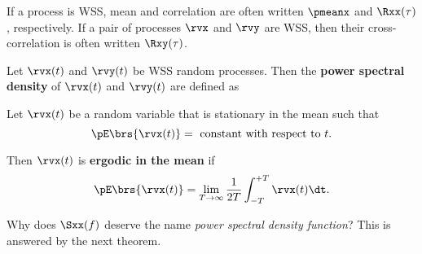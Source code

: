 If a process is WSS, mean and correlation are often written
$\pmeanx$ and $\Rxx(\tau)$, respectively.
If a pair of processes $\rvx$ and $\rvy$ are WSS,
then their cross-correlation is often written $\Rxy(\tau)$.

\begin{definition}
Let $\rvx(t)$ and $\rvy(t)$ be WSS random processes.
Then the \textbf{power spectral density} of $\rvx(t)$ and $\rvy(t)$ are defined as
\end{definition}


\begin{definition}
Let $\rvx(t)$ be a random variable that is stationary in the mean such that
\[ \pE\brs{\rvx(t)} = \mbox{ constant with respect to } t.\]

Then $\rvx(t)$ is \textbf{ergodic in the mean} if
\[ \pE\brs{\rvx(t)} = \lim_{T\to\infty}\frac{1}{2T}\int_{-T}^{+T}\rvx(t)\dt.\]
\end{definition}

Why does $\Sxx(f)$ deserve the name {\em power spectral density function}?
This is answered by the next theorem.

